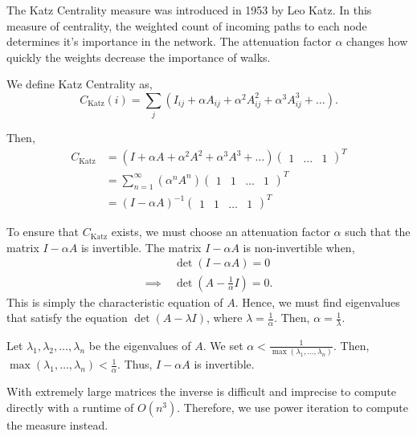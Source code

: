 \documentclass{article}
\begin{document}
The Katz Centrality measure was introduced in 1953 by Leo Katz. 
In this measure of centrality, the weighted count of incoming paths to each node determines it's importance in the network. The attenuation factor $\alpha$ changes how quickly the weights decrease the importance of walks.

We define Katz Centrality as,
\begin{equation*}
    C_{\textrm{Katz}}(i) = \sum_{j} (I_{ij} + \alpha A_{ij} + \alpha^2 A_{ij}^2 + \alpha^3 A_{ij}^3 + \dots).
\end{equation*}

Then,
\begin{align*}
    C_{\textrm{Katz}} &= (I + \alpha A + \alpha^2 A^2 + \alpha^3 A^3 + \dots) \begin{pmatrix}
        1 & \dots & 1
    \end{pmatrix}^T \\
    &= \sum^\infty_{n=1} (\alpha^n A^n)\begin{pmatrix}
    1 & 1 & \dots & 1
\end{pmatrix}^T \\ 
&= (I - \alpha A)^{-1} \begin{pmatrix}
    1 & 1 & \dots & 1
\end{pmatrix}^T 
\end{align*}

To ensure that $C_{\textrm{Katz}}$ exists, we must choose an attenuation factor $\alpha$ such that the matrix $I - \alpha A$ is invertible. The matrix $I - \alpha A$ is non-invertible when,
\begin{align*}
    & \det (I - \alpha A) = 0 \\
    \implies \; & \det (A - \frac{1}{\alpha} I) = 0.
\end{align*}
This is simply the characteristic equation of $A$. Hence, we must find eigenvalues that satisfy the equation $\det(A - \lambda I)$, where $\lambda = \frac{1}{\alpha}$. Then, $\alpha = \frac{1}{\lambda}$.

Let $\lambda_1, \lambda_2, \dots, \lambda_n$ be the eigenvalues of $A$. We set $\alpha < \frac{1}{\max(\lambda_1, \dots, \lambda_n)}$.
Then, $\max(\lambda_1, \dots, \lambda_n) < \frac{1}{\alpha}$. Thus, $I - \alpha A$ is invertible.



With extremely large matrices the inverse is difficult and imprecise to compute directly with a runtime of $O(n^3)$.
Therefore, we use power iteration to compute the measure instead.
\end{document}
